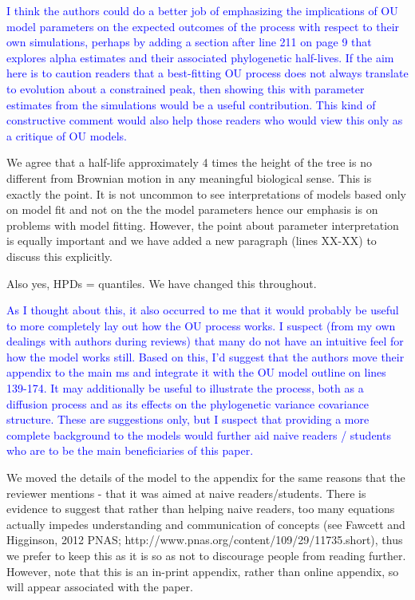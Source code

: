 \documentclass[12pt]{letter}
\begin{document}
\begin{letter}{}
\textcolor{blue}{I think the authors could do a better job of emphasizing the implications of OU model parameters on the expected outcomes of the process with respect to their own simulations, perhaps by adding a section after line 211 on page 9 that explores alpha estimates and their associated phylogenetic half-lives. If the aim here is to caution readers that a best-fitting OU process does not always translate to evolution about a constrained peak, then showing this with parameter estimates from the simulations would be a useful contribution. This kind of constructive comment would also help those readers who would view this only as a critique of OU models.}

We agree that a half-life approximately 4 times the height of the tree is no different from Brownian motion in any meaningful biological sense. This is exactly the point. It is not uncommon to see interpretations of models based only on model fit and not on the the model parameters hence our emphasis is on problems with model fitting. However, the point about parameter interpretation is equally important and we have added a new paragraph (lines XX-XX) %
to discuss this explicitly. 

Also yes, HPDs = quantiles. We have changed this throughout.

\textcolor{blue}{As I thought about this, it also occurred to me that it would probably be useful to more completely lay out how the OU process works. I suspect (from my own dealings with authors during reviews) that many do not have an intuitive feel for how the model works still. Based on this, I'd suggest that the authors move their appendix to the main ms and integrate it with the OU model outline on lines 139-174. It may additionally be useful to illustrate the process, both as a diffusion process and as its effects on the phylogenetic variance covariance structure. These are suggestions only, but I suspect that providing a more complete background to the models would further aid naive readers / students who are to be the main beneficiaries of this paper.}

We moved the details of the model to the appendix for the same reasons that the reviewer mentions - that it was aimed at naive readers/students. There is evidence to suggest that rather than helping naive readers, too many equations actually impedes understanding and communication of concepts (see Fawcett and Higginson, 2012 PNAS; http://www.pnas.org/content/109/29/11735.short), thus we prefer to keep this as it is so as not to discourage people from reading further. However, note that this is an in-print appendix, rather than online appendix, so will appear associated with the paper.


\end{letter}
\end{document}
